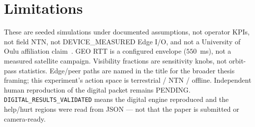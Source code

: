 \section{Limitations}
\label{sec:limitations}
These are seeded simulations under documented assumptions, not operator KPIs, not field NTN, not DEVICE\_MEASURED Edge I/O, and not a University of Oulu affiliation claim~\cite{itur_m2160,3gpp_tr38821}.
GEO RTT is a configured envelope ($550$~ms), not a measured satellite campaign.
Visibility fractions are sensitivity knobs, not orbit-pass statistics.
Edge/peer paths are named in the title for the broader thesis framing; this experiment's action space is terrestrial / NTN / offline.
Independent human reproduction of the digital packet remains PENDING.
\texttt{DIGITAL\_RESULTS\_VALIDATED} means the digital engine reproduced and the help/hurt regions were read from JSON --- not that the paper is submitted or camera-ready.
